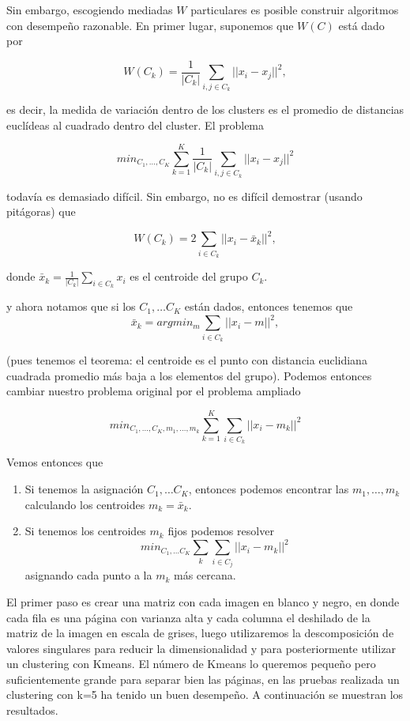 Sin embargo, escogiendo mediadas $W$ particulares es posible construir algoritmos con desempeño razonable. En primer lugar, suponemos que $W(C)$ está dado por

$$W(C_k) =\frac{1}{|C_k|}\sum_{i,j\in C_k} ||x_i-x_j||^2,$$

es decir, la medida de variación dentro de los clusters es el promedio de distancias
euclídeas al cuadrado dentro del cluster. El problema

$$min_{C_1,\ldots, C_K} \sum_{k=1}^K \frac{1}{|C_k|}\sum_{i,j\in C_k} ||x_i-x_j||^2$$ 

todavía es demasiado difícil. Sin embargo, no es difícil demostrar (usando pitágoras) que

$$W(C_k)=2\sum_{i\in C_k} ||x_i-\bar{x}_k||^2,$$

donde $\bar{x}_k=\frac{1}{|C_k|}\sum_{i\in C_k} x_i$ es el centroide del grupo $C_k$.


y ahora notamos que si los $C_1,\ldots C_K$ están dados, entonces
tenemos que
$$\bar{x}_k = argmin_{m} \sum_{i\in C_k} ||x_i-m||^2,$$

(pues tenemos el teorema: el centroide es el punto con distancia euclidiana cuadrada promedio más baja a los elementos del grupo). Podemos entonces cambiar nuestro
problema original por el problema ampliado

$$min_{C_1,\ldots, C_K, m_1,\ldots, m_k} \sum_{k=1}^K \sum_{i\in C_k} ||x_i-m_k||^2$$ 

Vemos entonces que
\begin{enumerate}

\item  Si tenemos la asignación $C_1,\ldots C_K$, entonces podemos
encontrar las $m_1,\ldots, m_k$ calculando los centroides $m_k = \bar{x}_k$.
\item  Si tenemos los centroides $m_k$ fijos podemos resolver
$$min_{C_1,\ldots C_K} \sum_k \sum_{i\in C_j} ||x_i - m_k||^2$$
asignando cada punto a la $m_k$ más cercana.

\end{enumerate}

El primer paso es crear una matriz  con cada imagen en blanco y negro, en donde cada fila es una página con varianza alta y cada columna el deshilado de la matriz de la imagen en escala de grises, luego utilizaremos la descomposición de valores singulares para reducir la dimensionalidad y para posteriormente utilizar un  clustering con Kmeans. El número de Kmeans lo queremos pequeño pero suficientemente grande para separar bien las páginas, en las pruebas realizada un clustering con k=5 ha tenido un buen desempeño. A continuación se muestran los resultados. 


